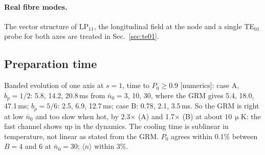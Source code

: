 \documentclass[11pt,a4paper]{article}
\newcommand{\micro}{\upmu}\newcommand{\metre}{m}\newcommand{\kelvin}{K}
\newcommand{\SI}[2]{\ensuremath{#1\,\mathrm{#2}}}
\begin{document}
\paragraph{Real fibre modes.} The vector structure of LP$_{11}$, the longitudinal field at the node and a single TE$_{01}$ probe for both axes are treated in Sec.~\ref{sec:te01}.

\subsection{Preparation time}
\label{sec:prep}\hypertarget{d:prep}{}
Banded evolution of one axis at $s=1$, time to $P_0\ge0.9$ [numerics]: case A, $b_p=1/2$: 5.8, 14.2, 20.8\,ms from $\bar n_0=3$, 10, 30, where the GRM gives 5.4, 18.0, 47.1\,ms; $b_p=5/6$: 2.5, 6.9, 12.7\,ms; case B: 0.78, 2.1, 3.5\,ms. So the GRM is right at low $\bar n_0$ and too slow when hot, by 2.3$\times$ (A) and 1.7$\times$ (B) at about \SI{10}{\micro K}: the fast channel shows up in the dynamics. The cooling time is sublinear in temperature, not linear as stated from the GRM. $P_0$ agrees within 0.1\% between $B=4$ and 6 at $\bar n_0=30$; $\langle n\rangle$ within 3\%.
\end{document}
